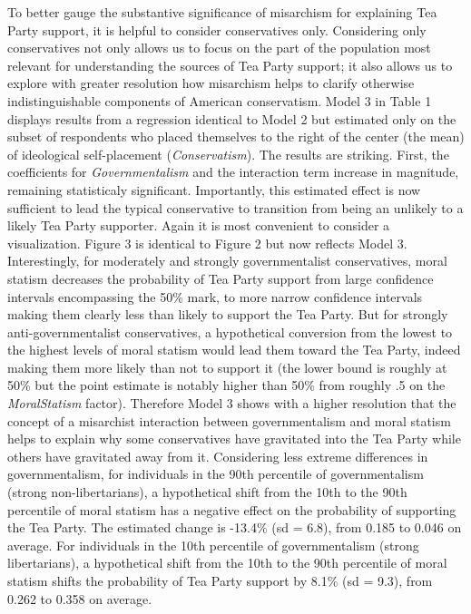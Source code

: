 \documentclass[12pt,]{article}
\begin{document}
To better gauge the substantive significance of misarchism for
explaining Tea Party support, it is helpful to consider conservatives
only. Considering only conservatives not only allows us to focus on the
part of the population most relevant for understanding the sources of
Tea Party support; it also allows us to explore with greater resolution
how misarchism helps to clarify otherwise indistinguishable components
of American conservatism. Model 3 in Table 1 displays results from a
regression identical to Model 2 but estimated only on the subset of
respondents who placed themselves to the right of the center (the mean)
of ideological self-placement (\emph{Conservatism}). The results are
striking. First, the coefficients for \emph{Governmentalism} and the
interaction term increase in magnitude, remaining statisticaly
significant. Importantly, this estimated effect is now sufficient to
lead the typical conservative to transition from being an unlikely to a
likely Tea Party supporter. Again it is most convenient to consider a
visualization. Figure 3 is identical to Figure 2 but now reflects Model
3. Interestingly, for moderately and strongly governmentalist
conservatives, moral statism decreases the probability of Tea Party
support from large confidence intervals encompassing the 50\% mark, to
more narrow confidence intervals making them clearly less than likely to
support the Tea Party. But for strongly anti-governmentalist
conservatives, a hypothetical conversion from the lowest to the highest
levels of moral statism would lead them toward the Tea Party, indeed
making them more likely than not to support it (the lower bound is
roughly at 50\% but the point estimate is notably higher than 50\% from
roughly .5 on the \emph{MoralStatism} factor). Therefore Model 3 shows
with a higher resolution that the concept of a misarchist interaction
between governmentalism and moral statism helps to explain why some
conservatives have gravitated into the Tea Party while others have
gravitated away from it. Considering less extreme differences in
governmentalism, for individuals in the 90th percentile of
governmentalism (strong non-libertarians), a hypothetical shift from the
10th to the 90th percentile of moral statism has a negative effect on
the probability of supporting the Tea Party. The estimated change is
-13.4\% (sd = 6.8), from 0.185 to 0.046 on average. For individuals in
the 10th percentile of governmentalism (strong libertarians), a
hypothetical shift from the 10th to the 90th percentile of moral statism
shifts the probability of Tea Party support by 8.1\% (sd = 9.3), from
0.262 to 0.358 on average.
\end{document}
